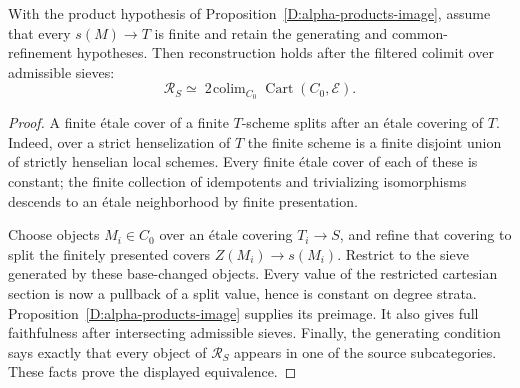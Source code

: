 \begin{corollary}
\label{D:alpha-products-finite}
With the product hypothesis of Proposition~\ref{D:alpha-products-image},
assume that every $s(M)\to T$ is finite and retain the generating
and common-refinement hypotheses. Then reconstruction holds after
the filtered colimit over admissible sieves:
\[
 \mathscr R_S\simeq
 \mathop{\mathrm{2\!\operatorname{colim}}}_{C_0}
          \operatorname{Cart}(C_0,\mathcal E).
\]
\end{corollary}
\begin{proof}
A finite \'etale cover of a finite $T$-scheme splits after an
\'etale covering of $T$. Indeed, over a strict henselization of
$T$ the finite scheme is a finite disjoint union of strictly
henselian local schemes. Every finite \'etale cover of each of
these is constant; the finite collection of idempotents and
trivializing isomorphisms descends to an \'etale neighborhood by
finite presentation.

Choose objects $M_i\in C_0$ over an \'etale covering $T_i\to S$,
and refine that covering to split the finitely presented covers
$Z(M_i)\to s(M_i)$. Restrict to the sieve generated by these
base-changed objects. Every value of the restricted cartesian
section is now a pullback of a split value, hence is constant on
degree strata. Proposition~\ref{D:alpha-products-image} supplies
its preimage. It also gives full faithfulness after intersecting
admissible sieves. Finally, the generating condition says exactly
that every object of $\mathscr R_S$ appears in one of the source
subcategories. These facts prove the displayed equivalence.
\end{proof}

